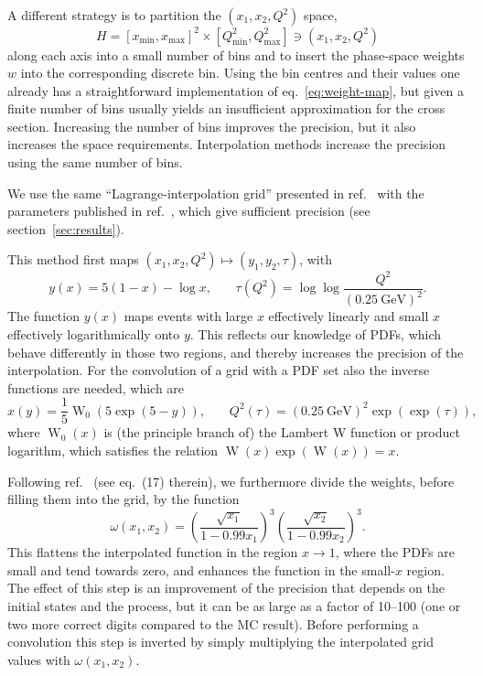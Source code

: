 A different strategy is to partition the $(x_1, x_2, Q^2)$ space,
\begin{equation}
H = [x_\mathrm{min},x_\mathrm{max}]^2 \times [Q^2_\mathrm{min}, Q^2_\mathrm{max}] \ni (x_1, x_2, Q^2)
\end{equation}
along each axis into a small number of bins and to insert the phase-space weights $w$ into the corresponding discrete bin.
Using the bin centres and their values one already has a straightforward implementation of eq.~\eqref{eq:weight-map}, but given a finite number of bins usually yields an insufficient approximation for the cross section.
Increasing the number of bins improves the precision, but it also increases the space requirements.
Interpolation methods increase the precision using the same number of bins.

We use the same \enquote{Lagrange-interpolation grid} presented in ref.~\cite{Carli:2010rw} with the parameters published in ref.~\cite{Bertone:2014zva}, which give sufficient precision (see section~\ref{sec:results}).

This method first maps $(x_1, x_2, Q^2) \mapsto (y_1, y_2, \tau)$, with
\begin{equation}
y(x) = 5 (1-x) - \log x \text{,} \qquad \tau (Q^2) = \log \log \frac{Q^2}{(\SI{0.25}{\giga\electronvolt})^2} \text{.}
\label{eq:maps}
\end{equation}
The function $y(x)$ maps events with large $x$ effectively linearly and small $x$ effectively logarithmically onto $y$.
This reflects our knowledge of PDFs, which behave differently in those two regions, and thereby increases the precision of the interpolation.
For the convolution of a grid with a PDF set also the inverse functions are needed, which are
\begin{equation}
x(y) = \frac{1}{5} \operatorname{W}_0 (5 \exp (5-y)) \text{,} \qquad Q^2 (\tau) = (\SI{0.25}{\giga\electronvolt})^2 \exp (\exp (\tau)) \text{,}
\end{equation}
where $\operatorname{W}_0 (x)$ is (the principle branch of) the Lambert W function or product logarithm, which satisfies the relation $\operatorname{W} (x) \exp (\operatorname{W} (x)) = x$.

Following ref.~\cite{Carli:2010rw} (see eq.~(17) therein), we furthermore divide the weights, before filling them into the grid, by the function
\begin{equation}
\omega (x_1, x_2) = \left( \frac{\sqrt{x_1}}{1 - 0.99 x_1} \right)^3 \left( \frac{\sqrt{x_2}}{1 - 0.99 x_2} \right)^3 \text{.}
\end{equation}
This flattens the interpolated function in the region $x \to 1$, where the PDFs are small and tend towards zero, and enhances the function in the small-$x$ region.
The effect of this step is an improvement of the precision that depends on the initial states and the process, but it can be as large as a factor of \numrange{10}{100} (one or two more correct digits compared to the MC result).
Before performing a convolution this step is inverted by simply multiplying the interpolated grid values with $\omega (x_1, x_2)$.

